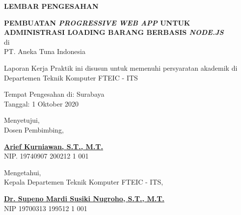 \begin{center}
  {\Large \textbf{LEMBAR PENGESAHAN}}
  \vspace{4ex}


  {\large \textbf{PEMBUATAN \emph{PROGRESSIVE WEB APP} UNTUK ADMINISTRASI LOADING BARANG BERBASIS \emph{NODE.JS}}} \\
  di \\
  PT. Aneka Tuna Indonesia
  \vspace{4ex}

  Laporan Kerja Praktik ini disusun untuk memenuhi persyaratan akademik di Departemen Teknik Komputer FTEIC - ITS
  \vspace{2ex}

  Tempat Pengesahan di: Surabaya \\
  Tanggal: 1 Oktober 2020
  \vspace{8ex}

  Menyetujui, \\
  Dosen Pembimbing,
  \vspace{12ex}

  \textbf{\underline{Arief Kurniawan, S.T., M.T.}} \\
  NIP. 19740907 200212 1 001
  \vspace{8ex}

  Mengetahui, \\
  Kepala Departemen Teknik Komputer FTEIC - ITS,
  \vspace{12ex}

  \textbf{\underline{Dr. Supeno Mardi Susiki Nugroho, S.T., M.T.}} \\
  NIP 19700313 199512 1 001

\end{center}
